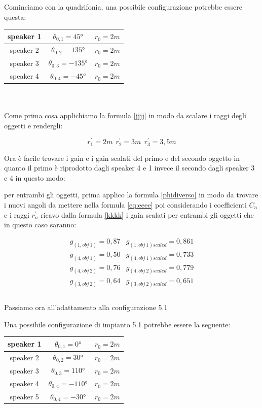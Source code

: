 \documentclass[12pt,a4paper]{report}
\begin{document}
\begin{itemize}
Cominciamo con la quadrifonia, una possibile configurazione potrebbe essere questa:\\

\begin{tabular}{|c|c|c|}
\hline
speaker 1 & $\theta_{0,1}=45°$ & $r_0=2m$\\
\hline
speaker 2 & $\theta_{0,2}=135°$ & $r_0=2m$\\
\hline
speaker 3 & $\theta_{0,3}=-135°$ & $r_0=2m$\\
\hline
speaker 4 & $\theta_{0,4}=-45°$ & $r_0=2m$\\
\hline
\end{tabular} \\
\\

Come prima cosa applichiamo la formula \ref{jjjj} in modo da scalare i raggi degli oggetti e rendergli:

\[r_1^{\prime}=2m \ \  r_2^{\prime}=3m \ \ r_3^{\prime}=3,5m  \]

Ora è facile trovare i gain e i gain scalati del primo e del secondo oggetto in quanto il primo è riprodotto dagli speaker 4 e 1 invece il secondo dagli speaker 3 e 4 in questo modo:

per entrambi gli oggetti, prima applico la formula \ref{phidiverso} in modo da trovare i nuovi angoli da mettere nella formula \ref{eq:eeee} poi considerando i coefficienti $C_n$ e i raggi $r_n^{\prime}$ ricavo dalla formula \ref{kkkk} i gain scalati per entrambi gli oggetti che in questo caso saranno:

\begin{equation}
\begin{matrix}
g_{(1,obj\ 1)} = 0,87 & g_{(1,obj\ 1)scaled} = 0,861\\
g_{(4,obj\ 1)} = 0,50 & g_{(4,obj\ 1)scaled} = 0,733\\
g_{(4,obj\ 2)} = 0,76 & g_{(4,obj\ 2)scaled} = 0,779\\
g_{(3,obj\ 2)} = 0,64 & g_{(3,obj\ 2)scaled} = 0,651\\
\end{matrix}
\label{gscalatiesempio1}
\end{equation}
\\

Passiamo ora all'adattamento alla configurazione 5.1

Una possibile configurazione di impianto 5.1 potrebbe essere la seguente:

\begin{tabular}{|c|c|c|}
\hline
speaker 1 & $\theta_{0,1}=0°$ & $r_0=2m$\\
\hline
speaker 2 & $\theta_{0,2}=30°$ & $r_0=2m$\\
\hline
speaker 3 & $\theta_{0,3}=110°$ & $r_0=2m$\\
\hline
speaker 4 & $\theta_{0,4}=-110°$ & $r_0=2m$\\
\hline
speaker 5 & $\theta_{0,4}=-30°$ & $r_0=2m$\\
\hline
\end{tabular} \\
\\


\end{itemize}
\end{document}
